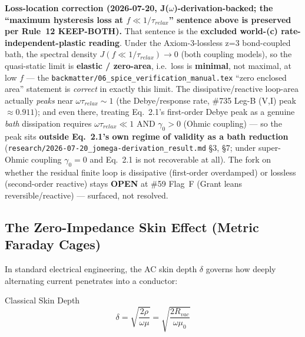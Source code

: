 \noindent\textbf{Loss-location correction (2026-07-20, J($\omega$)-derivation-backed; the ``maximum hysteresis loss at $f \ll 1/\tau_{relax}$'' sentence above is preserved per Rule~12 KEEP-BOTH).} That sentence is the \textbf{excluded world-(c) rate-independent-plastic reading}. Under the Axiom-3-lossless z=3 bond-coupled bath, the spectral density $J(f \ll 1/\tau_{relax}) \to 0$ (both coupling models), so the quasi-static limit is \textbf{elastic / zero-area}, i.e.\ loss is \textbf{minimal}, not maximal, at low $f$ --- the \texttt{backmatter/06\_spice\_verification\_manual.tex} ``zero enclosed area'' statement is \emph{correct} in exactly this limit. The dissipative/reactive loop-area actually \emph{peaks} near $\omega\tau_{relax} \sim 1$ (the Debye/response rate, \#735 Leg-B (V,I) peak $\approx 0.911$); and even there, treating Eq.~2.1's first-order Debye peak as a genuine \emph{bath} dissipation requires $\omega\tau_{relax} \ll 1$ AND $\gamma_0 > 0$ (Ohmic coupling) --- so the peak sits \textbf{outside Eq.~2.1's own regime of validity as a bath reduction} (\texttt{research/2026-07-20\_jomega-derivation\_result.md} \S3, \S7; under super-Ohmic coupling $\gamma_0 = 0$ and Eq.~2.1 is not recoverable at all). The fork on whether the residual finite loop is dissipative (first-order overdamped) or lossless (second-order reactive) stays \textbf{OPEN} at \#59 Flag~F (Grant leans reversible/reactive) --- surfaced, not resolved.

\subsection{The Zero-Impedance Skin Effect (Metric Faraday Cages)}

In standard electrical engineering, the AC skin depth $\delta$ governs how deeply alternating current penetrates into a conductor:
\begin{resultbox}{Classical Skin Depth}
\begin{equation}
    \delta = \sqrt{\frac{2\rho}{\omega\mu}} = \sqrt{\frac{2 R_{vac}}{\omega\mu_0}}
    \label{eq:skin_depth}
\end{equation}
\end{resultbox}

